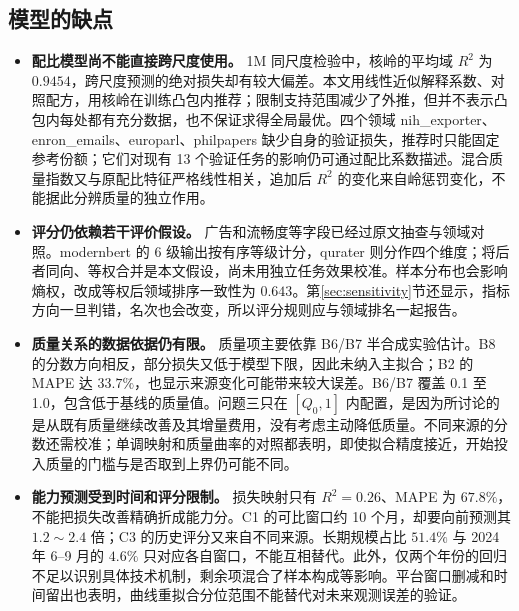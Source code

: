 \subsection{模型的缺点}
\begin{itemize}[itemindent=2em]
\item \textbf{配比模型尚不能直接跨尺度使用。} 1M 同尺度检验中，核岭的平均域 $R^2$ 为 $0.9454$，跨尺度预测的绝对损失却有较大偏差。本文用线性近似解释系数、对照配方，用核岭在训练凸包内推荐；限制支持范围减少了外推，但并不表示凸包内每处都有充分数据，也不保证求得全局最优。四个领域 nih\_\allowbreak{}exporter、enron\_\allowbreak{}emails、europarl、philpapers 缺少自身的验证损失，推荐时只能固定参考份额；它们对现有 13 个验证任务的影响仍可通过配比系数描述。混合质量指数又与原配比特征严格线性相关，追加后 $R^2$ 的变化来自岭惩罚变化，不能据此分辨质量的独立作用。
\item \textbf{评分仍依赖若干评价假设。} 广告和流畅度等字段已经过原文抽查与领域对照。modernbert 的 6 级输出按有序等级计分，qurater 则分作四个维度；将后者同向、等权合并是本文假设，尚未用独立任务效果校准。样本分布也会影响熵权，改成等权后领域排序一致性为 $0.643$。第\ref{sec:sensitivity}节还显示，指标方向一旦判错，名次也会改变，所以评分规则应与领域排名一起报告。
\item \textbf{质量关系的数据依据仍有限。} 质量项主要依靠 B6/B7 半合成实验估计。B8 的分数方向相反，部分损失又低于模型下限，因此未纳入主拟合；B2 的 MAPE 达 $33.7\%$，也显示来源变化可能带来较大误差。B6/B7 覆盖 0.1 至 1.0，包含低于基线的质量值。问题三只在 $[Q_0,1]$ 内配置，是因为所讨论的是从既有质量继续改善及其增量费用，没有考虑主动降低质量。不同来源的分数还需校准；单调映射和质量曲率的对照都表明，即使拟合精度接近，开始投入质量的门槛与是否取到上界仍可能不同。
\item \textbf{能力预测受到时间和评分限制。} 损失映射只有 $R^2=0.26$、MAPE 为 $67.8\%$，不能把损失改善精确折成能力分。C1 的可比窗口约 10 个月，却要向前预测其 $1.2\sim2.4$ 倍；C3 的历史评分又来自不同来源。长期规模占比 $51.4\%$ 与 2024 年 6--9 月的 $4.6\%$ 只对应各自窗口，不能互相替代。此外，仅两个年份的回归不足以识别具体技术机制，剩余项混合了样本构成等影响。平台窗口删减和时间留出也表明，曲线重拟合分位范围不能替代对未来观测误差的验证。
\end{itemize}
